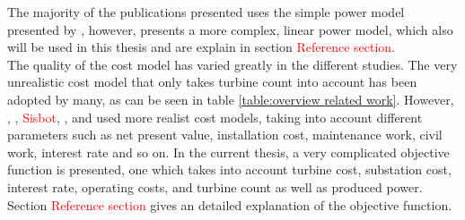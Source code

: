\noindent The majority of the publications presented uses the simple power model presented by \citep{Mosetti}, however, \citep{Kusiak} presents a more complex, linear power model, which also will be used in this thesis and are explain in section \textcolor{red}{Reference section}.\\ 

\noindent The quality of the cost model has varied greatly in the different studies. The very unrealistic cost model that only takes turbine count into account has been adopted by many, as can be seen in table \ref{table:overview related work}. However, \citep{Mora}, \citep{Gonzales}, \textcolor{red}{Sisbot}, \citep{Saavedra-Morena}, and \citep{Chen} used more realist cost models, taking into account different parameters such as net present value, installation cost, maintenance work, civil work, interest rate and so on. In the current thesis, a very complicated objective function is presented, one which takes into account turbine cost, substation cost, interest rate, operating costs, and turbine count as well as produced power. Section \textcolor{red}{Reference section} gives an detailed explanation of the objective function. \\

